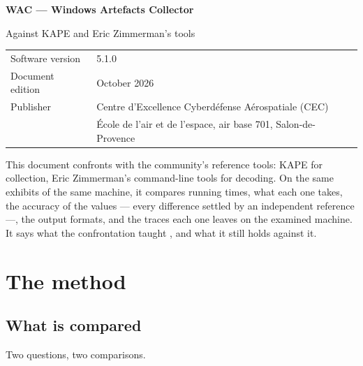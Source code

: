 \documentclass[11pt,a4paper,oneside]{report}
\begin{document}

\thispagestyle{empty}
\vspace*{\fill}
{\color{marine}\Large\bfseries WAC — Windows Artefacts Collector}\par
{\color{bleu}Against KAPE and Eric Zimmerman's tools}\par
\medskip
\begin{tabular}{@{}ll@{}}
Software version & 5.1.0 \\
Document edition & October 2026 \\
Publisher & Centre d'Excellence Cyberdéfense Aérospatiale (CEC) \\
          & École de l'air et de l'espace, air base 701, Salon-de-Provence \\
\end{tabular}

\bigskip
{\small\color{gris}This document confronts \wac{} with the community's
reference tools: KAPE for collection, Eric Zimmerman's command-line tools for
decoding. On the same exhibits of the same machine, it compares running times,
what each one takes, the accuracy of the values --- every difference settled by
an independent reference ---, the output formats, and the traces each one leaves
on the examined machine. It says what the confrontation taught
\wac{}, and what it still holds against it.}
\vspace*{2cm}
\clearpage

\tableofcontents

\chapter{The method}

\section{What is compared}

Two questions, two comparisons.
\end{document}
